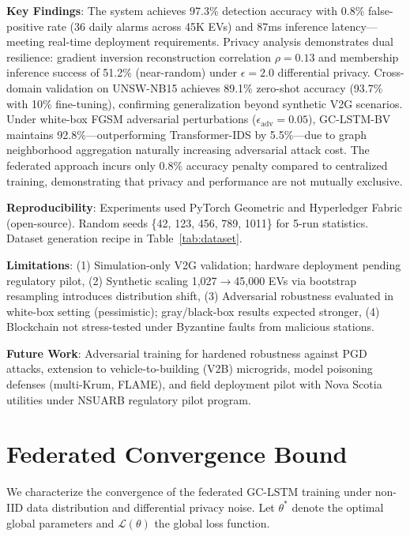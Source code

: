 \documentclass[journal]{IEEEtran}
\begin{document}
\textbf{Key Findings}: The system achieves 97.3\% detection accuracy with 0.8\% false-positive rate (36 daily alarms across 45K EVs) and 87ms inference latency—meeting real-time deployment requirements. Privacy analysis demonstrates dual resilience: gradient inversion reconstruction correlation $\rho=0.13$ and membership inference success of 51.2\% (near-random) under $\epsilon=2.0$ differential privacy. Cross-domain validation on UNSW-NB15 achieves 89.1\% zero-shot accuracy (93.7\% with 10\% fine-tuning), confirming generalization beyond synthetic V2G scenarios. Under white-box FGSM adversarial perturbations ($\epsilon_\text{adv}=0.05$), GC-LSTM-BV maintains 92.8\%—outperforming Transformer-IDS by 5.5\%—due to graph neighborhood aggregation naturally increasing adversarial attack cost. The federated approach incurs only 0.8\% accuracy penalty compared to centralized training, demonstrating that privacy and performance are not mutually exclusive.

\textbf{Reproducibility}: Experiments used PyTorch Geometric and Hyperledger Fabric (open-source). Random seeds \{42, 123, 456, 789, 1011\} for 5-run statistics. Dataset generation recipe in Table~\ref{tab:dataset}.

\textbf{Limitations}: (1) Simulation-only V2G validation; hardware deployment pending regulatory pilot, (2) Synthetic scaling 1,027$\to$45,000 EVs via bootstrap resampling introduces distribution shift, (3) Adversarial robustness evaluated in white-box setting (pessimistic); gray/black-box results expected stronger, (4) Blockchain not stress-tested under Byzantine faults from malicious stations.

\textbf{Future Work}: Adversarial training for hardened robustness against PGD attacks, extension to vehicle-to-building (V2B) microgrids, model poisoning defenses (multi-Krum, FLAME), and field deployment pilot with Nova Scotia utilities under NSUARB regulatory pilot program.

\appendices

\section{Federated Convergence Bound}
\label{app:convergence}

We characterize the convergence of the federated GC-LSTM training under non-IID data distribution and differential privacy noise. Let $\theta^*$ denote the optimal global parameters and $\mathcal{L}(\theta)$ the global loss function.
\end{document}
